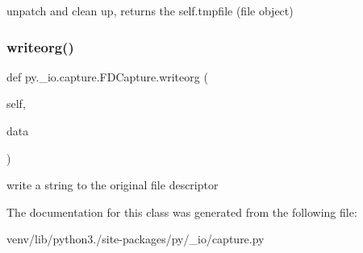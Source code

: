 \begin{DoxyVerb}unpatch and clean up, returns the self.tmpfile (file object)
\end{DoxyVerb}
 \mbox{\label{classpy_1_1__io_1_1capture_1_1_f_d_capture_ad296b26bfbeaad94f4fcc4db00fec633}} 
\subsubsection{\texorpdfstring{writeorg()}{writeorg()}}
{\footnotesize\ttfamily def py.\+\_\+io.\+capture.\+F\+D\+Capture.\+writeorg (\begin{DoxyParamCaption}\item[{}]{self,  }\item[{}]{data }\end{DoxyParamCaption})}

\begin{DoxyVerb}write a string to the original file descriptor
\end{DoxyVerb}
 

The documentation for this class was generated from the following file\+:\begin{DoxyCompactItemize}
\item 
venv/lib/python3./site-\/packages/py/\+\_\+io/capture.\+py\end{DoxyCompactItemize}
